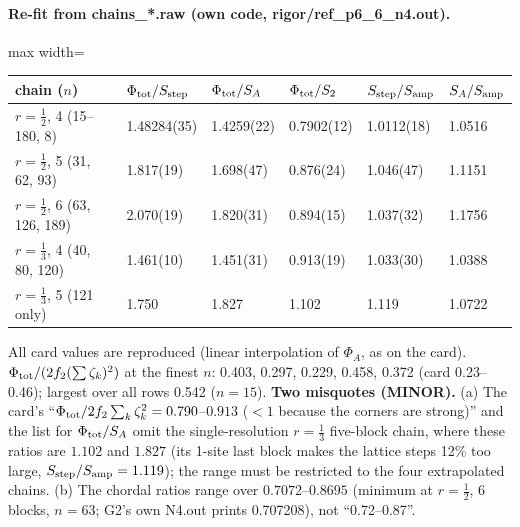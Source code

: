 \documentclass[11pt]{article}
\begin{document}
\paragraph{Re-fit from chains\_*.raw (own code, rigor/ref\_p6\_6\_n4.out).}
\begin{center}\small
\begin{adjustbox}{max width=\textwidth}\begin{tabular}{llllll}
\toprule
chain ($n$) & $\Phi_{\rm tot}/S_{\rm step}$ & $\Phi_{\rm tot}/S_A$ & $\Phi_{\rm tot}/S_2$ & $S_{\rm step}/S_{\rm amp}$ & $S_A/S_{\rm amp}$\\
\midrule
$r=\frac12$, 4 (15--180, 8) & 1.48284(35) & 1.4259(22) & 0.7902(12) & 1.0112(18) & 1.0516\\
$r=\frac12$, 5 (31, 62, 93) & 1.817(19) & 1.698(47) & 0.876(24) & 1.046(47) & 1.1151\\
$r=\frac12$, 6 (63, 126, 189) & 2.070(19) & 1.820(31) & 0.894(15) & 1.037(32) & 1.1756\\
$r=\frac13$, 4 (40, 80, 120) & 1.461(10) & 1.451(31) & 0.913(19) & 1.033(30) & 1.0388\\
$r=\frac13$, 5 (121 only) & 1.750 & 1.827 & 1.102 & 1.119 & 1.0722\\
\bottomrule
\end{tabular}\end{adjustbox}
\end{center}
All card values are reproduced (linear interpolation of $\Phi_A$, as on the card). $\Phi_{\rm tot}/(2f_2(\sum\zeta_k)^2)$
at the finest $n$: 0.403, 0.297, 0.229, 0.458, 0.372 (card 0.23--0.46); largest over all rows 0.542 ($n=15$).
\textbf{Two misquotes (MINOR).} (a) The card's ``$\Phi_{\rm tot}/2f_2\sum_k\zeta_k^2=0.790$--$0.913$ ($<1$ because
the corners are strong)'' and the list for $\Phi_{\rm tot}/S_A$ omit the single-resolution $r=\frac13$ five-block
chain, where these ratios are $1.102$ and $1.827$ (its 1-site last block makes the lattice steps 12\% too large,
$S_{\rm step}/S_{\rm amp}=1.119$); the range must be restricted to the four extrapolated chains. (b) The chordal
ratios range over $0.7072$--$0.8695$ (minimum at $r=\frac12$, 6 blocks, $n=63$; G2's own N4.out prints 0.707208),
not ``0.72--0.87''.
\end{document}
